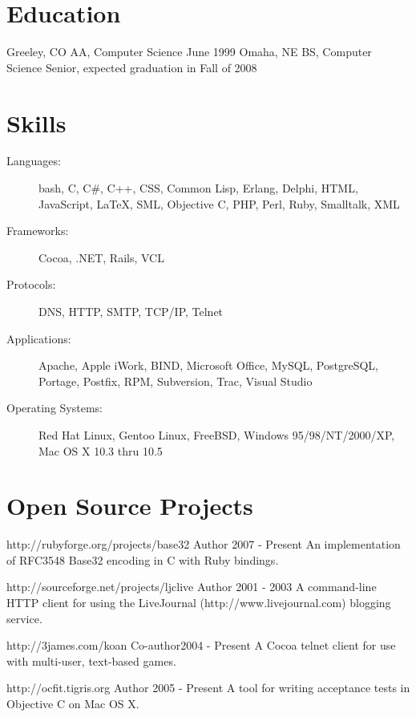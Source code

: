 \documentclass{resume}
\begin{document}
\section{Education}
\begin{itemize}
             {Greeley, CO}
             {AA, Computer Science}
             {June 1999}
             {Omaha, NE}
             {BS, Computer Science}
             {Senior, expected graduation in Fall of 2008}
\end{itemize}

\section{Skills}
\begin{description}
\item[Languages:] bash, C, C\#, C++, CSS, Common Lisp, Erlang, Delphi, HTML,
  JavaScript, \LaTeX, SML, Objective C, PHP, Perl, Ruby, Smalltalk, XML
\item[Frameworks:] Cocoa, .NET, Rails, VCL
\item[Protocols:] DNS, HTTP, SMTP, TCP/IP, Telnet
\item[Applications:] Apache, Apple iWork, BIND, Microsoft Office, MySQL,
  PostgreSQL, Portage, Postfix, RPM, Subversion, Trac, Visual Studio
\item[Operating Systems:] Red Hat Linux, Gentoo Linux, FreeBSD, Windows
  95/98/NT/2000/XP, Mac OS X 10.3 thru 10.5
\end{description}

\section{Open Source Projects}
\begin{itemize}
             {http://rubyforge.org/projects/base32}
             {Author}
             {2007 - Present}
             An implementation of RFC3548 Base32 encoding in C with Ruby
             bindings.

             {http://sourceforge.net/projects/ljclive}
             {Author}
             {2001 - 2003}
             A command-line HTTP client for using the LiveJournal
             (http://www.livejournal.com) blogging service.

             {http://3james.com/koan}
             {Co-author}{2004 - Present}
             A Cocoa telnet client for use with multi-user, text-based games.

             {http://ocfit.tigris.org}
             {Author}
             {2005 - Present}
             A tool for writing acceptance tests in Objective C on Mac OS X.
\end{itemize}
\end{document}
